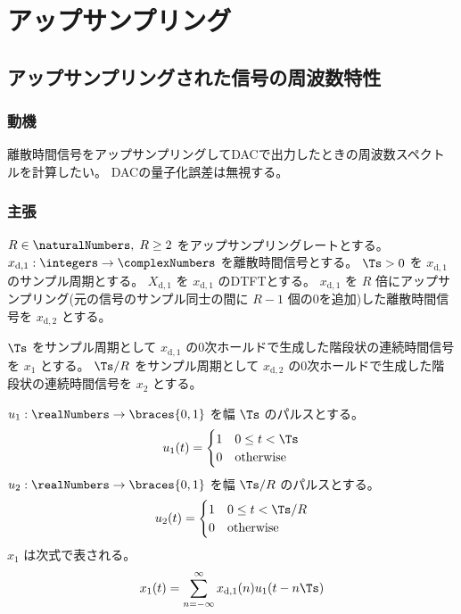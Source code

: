 \chapter{アップサンプリング}
    \section{アップサンプリングされた信号の周波数特性}
        \newcommand{\xda}{x_{\text{d},1}}
        \newcommand{\Xda}{X_{\text{d},1}}
        \newcommand{\xdb}{x_{\text{d},2}}
        \subsection{動機}
            離散時間信号をアップサンプリングしてDACで出力したときの周波数スペクトルを計算したい。
            DACの量子化誤差は無視する。
        \subsection{主張}
            $R\in\naturalNumbers,\;R\geq 2$ をアップサンプリングレートとする。
            $\xda:\integers\to\complexNumbers$ を離散時間信号とする。
            $\Ts>0$ を $\xda$ のサンプル周期とする。
            $\Xda$ を $\xda$ のDTFTとする。
            $\xda$ を $R$ 倍にアップサンプリング(元の信号のサンプル同士の間に $R-1$ 個の0を追加)した離散時間信号を $\xdb$ とする。
            \par
            $\Ts$ をサンプル周期として $\xda$ の0次ホールドで生成した階段状の連続時間信号を $x_1$ とする。
            $\Ts/R$ をサンプル周期として $\xdb$ の0次ホールドで生成した階段状の連続時間信号を $x_2$ とする。
            \par
            $u_1:\realNumbers\to\braces{0,1}$ を幅 $\Ts$ のパルスとする。
            \[
                u_1(t) = \begin{cases}
                    1 & 0\leq t < \Ts \\
                    0 & \text{otherwise}
                \end{cases}
            \]
            $u_2:\realNumbers\to\braces{0,1}$ を幅 $\Ts/R$ のパルスとする。
            \[
                u_2(t) = \begin{cases}
                    1 & 0\leq t < \Ts/R \\
                    0 & \text{otherwise}
                \end{cases}
            \]
            $x_1$ は次式で表される。
            \[ x_1(t) = \sum_{n=-\infty}^\infty \xda(n)u_1(t-n\Ts) \]
